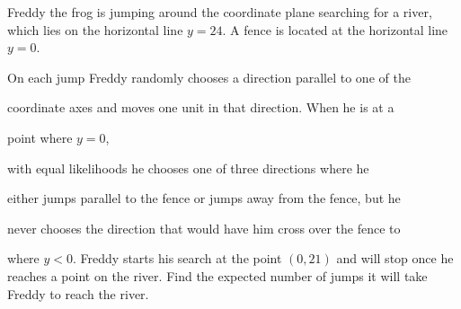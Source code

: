 Freddy the frog is jumping around the coordinate plane searching for a river, which lies on the horizontal line $y = 24$. A fence is located at the horizontal line $y = 0$.

 On each jump Freddy randomly chooses a direction parallel to one of the

 coordinate axes and moves one unit in that direction. When he is at a 

point where $y=0$, 

 with equal likelihoods he chooses one of three directions where he 

either jumps parallel to the fence or jumps away from the fence, but he 

never chooses the direction that would have him cross over the fence to 

where $y < 0$. Freddy starts his search at the point $(0, 21)$ and will stop once he reaches a point on the river. Find the expected number of jumps it will take Freddy to reach the river.